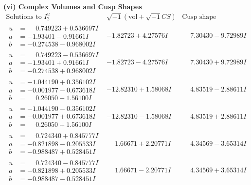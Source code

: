 \documentclass[1p]{elsarticle_modified}
\theoremstyle{definition}
\newcommand{\I}{\sqrt{-1}}
\begin{document}
\newpage\flushleft \textbf{(vi) Complex Volumes and Cusp Shapes}
$$\begin{array}{c|c|c}  
\text{Solutions to }I^u_{2}& \I (\text{vol} + \sqrt{-1}CS) & \text{Cusp shape}\\
 \hline 
\begin{aligned}
u &= \phantom{-}0.749223 + 0.536697 I \\
a &= -1.93401 - 0.91661 I \\
b &= -0.274538 - 0.968002 I\end{aligned}
 & -1.82723 + 4.27576 I & \phantom{-}7.30430 - 9.72989 I \\ \hline\begin{aligned}
u &= \phantom{-}0.749223 - 0.536697 I \\
a &= -1.93401 + 0.91661 I \\
b &= -0.274538 + 0.968002 I\end{aligned}
 & -1.82723 - 4.27576 I & \phantom{-}7.30430 + 9.72989 I \\ \hline\begin{aligned}
u &= -1.044190 + 0.356102 I \\
a &= -0.001977 - 0.673618 I \\
b &= \phantom{-}0.26050 - 1.56100 I\end{aligned}
 & -12.82310 + 1.58068 I & \phantom{-}4.83519 - 2.88611 I \\ \hline\begin{aligned}
u &= -1.044190 - 0.356102 I \\
a &= -0.001977 + 0.673618 I \\
b &= \phantom{-}0.26050 + 1.56100 I\end{aligned}
 & -12.82310 - 1.58068 I & \phantom{-}4.83519 + 2.88611 I \\ \hline\begin{aligned}
u &= \phantom{-}0.724340 + 0.845777 I \\
a &= -0.821898 - 0.205533 I \\
b &= -0.988487 + 0.528451 I\end{aligned}
 & \phantom{-}1.66671 + 2.20771 I & \phantom{-}4.34569 - 3.65314 I \\ \hline\begin{aligned}
u &= \phantom{-}0.724340 - 0.845777 I \\
a &= -0.821898 + 0.205533 I \\
b &= -0.988487 - 0.528451 I\end{aligned}
 & \phantom{-}1.66671 - 2.20771 I & \phantom{-}4.34569 + 3.65314 I \\ \hline\begin{aligned}

\end{aligned}
\end{array}$$
\end{document}
